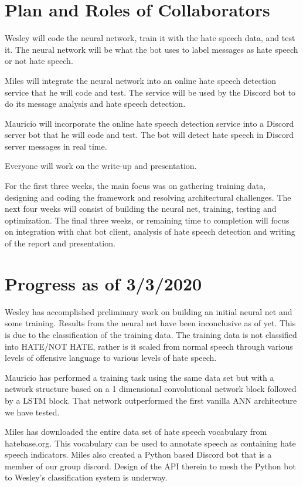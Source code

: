 \documentclass[conference]{sig-alternate-05-2015}
\begin{document}
\section{Plan and Roles of Collaborators}

Wesley will code the neural network, train it with the hate speech data, and test it. The neural network will be what the bot uses to label messages as hate speech or not hate speech.

Miles will integrate the neural network into an online hate speech detection service that he will code and test. The service will be used by the Discord bot to do its message analysis and hate speech detection. 

Mauricio will incorporate the online hate speech detection service into a Discord server bot that he will code and test. The bot will detect hate speech in Discord server messages in real time.

Everyone will work on the write-up and presentation.

For the first three weeks, the main focus was on gathering training data, designing and coding the framework and resolving architectural challenges.  The next four weeks will consist of building the neural net, training, testing and optimization.  The final three weeks, or remaining time to completion will focus on integration with chat bot client, analysis of hate speech detection and writing of the report and presentation.

\section{Progress as of 3/3/2020}

Wesley has accomplished preliminary work on building an initial neural net and some training.  Results from the neural net have been inconclusive as of yet.  This is due to the classification of the training data.  The training data is not classified into HATE/NOT HATE, rather is it scaled from normal speech through various levels of offensive language to various levels of hate speech.

Mauricio has performed a training task using the same data set but with a network structure based on a 1 dimensional convolutional network block followed by a LSTM block. That network outperformed the first vanilla ANN architecture we have tested.

Miles has downloaded the entire data set of hate speech vocabulary from hatebase.org.  This vocabulary can be used to annotate speech as containing hate speech indicators.  Miles also created a Python based Discord bot that is a member of our group discord.  Design of the API therein to mesh the Python bot to Wesley's classification system is underway.
\end{document}

